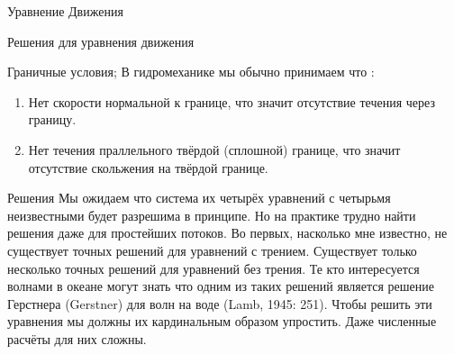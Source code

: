 \begin{chapter}{Уравнение Движения}
\begin{section}{Решения для уравнения движения}
\begin{paragraph}{Граничные условия;}
В гидромеханике мы обычно принимаем что :
\begin{enumerate}
\item
Нет скорости нормальной к границе, что значит отсутствие течения через
границу.
%

\item
Нет течения праллельного твёрдой (сплошной) границе, что значит
отсутствие скольжения на твёрдой границе.
%
\end{enumerate}
\end{paragraph}

\begin{paragraph}{Решения}
Мы ожидаем что система их четырёх уравнений с четырьмя неизвестными
будет разрешима в принципе. Но на практике трудно найти решения даже
для простейших потоков. Во первых, насколько мне известно, не
существует точных решений для уравнений с трением. Существует только
несколько точных решений для уравнений без трения. Те кто интересуется
волнами в океане могут знать что одним из таких решений является
решение Герстнера (Gerstner) для волн на воде (Lamb, 1945: 251). Чтобы
решить эти уравнения мы должны их кардинальным образом упростить. Даже
численные расчёты для них сложны.
%


\end{paragraph}
\end{section}
\end{chapter}
